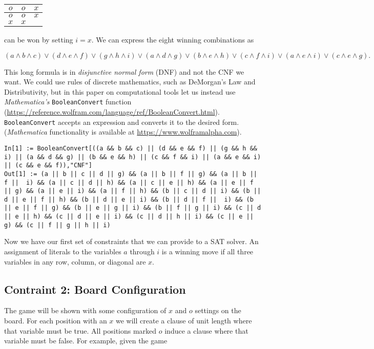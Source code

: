 \documentclass[12pt]{article}
\newcommand{\tictactoe}[9]{\begin{center}\begin{tabular}{ c | c | c }{$#1$} & {$#2$} & {$#3$} \\ \hline {$#4$} & {$#5$} & {$#6$} \\ \hline {$#7$} & {$#8$} & {$#9$} \end{tabular}\end{center}}
\begin{document}
\tictactoe{o}{o}{x}{o}{o}{x}{x}{x}{}

can be won by setting $i=x$.  We can express the eight winning combinations as

\begin{equation}(a \wedge b \wedge c) \vee (d \wedge e \wedge f) \vee (g \wedge h \wedge i)
\vee
(a \wedge d \wedge g) \vee (b \wedge e \wedge h) \vee (c \wedge f \wedge i)
\vee
(a \wedge e \wedge i) \vee (c \wedge e \wedge g).\end{equation}

This long formula is in \textit{disjunctive normal form} (DNF) and not the CNF we want.
We could use rules of discrete mathematics, such as DeMorgan's Law and Distributivity, but in this paper on computational tools let us instead use \textit{Mathematica's} \texttt{BooleanConvert} function (\url{https://reference.wolfram.com/language/ref/BooleanConvert.html}).
\texttt{BooleanConvert} accepts an expression and converts it to the desired form.
(\textit{Mathematica} functionality is available at \url{https://www.wolframalpha.com}).

\begin{lstlisting}
In[1] := BooleanConvert[((a && b && c) || (d && e && f) || (g && h && i) || (a && d && g) || (b && e && h) || (c && f && i) || (a && e && i) || (c && e && f)),"CNF"]
Out[1] := (a || b || c || d || g) && (a || b || f || g) && (a || b || f ||  i) && (a || c || d || h) && (a || c || e || h) && (a || e || f || g) && (a || e || i) && (a || f || h) && (b || c || d || i) && (b || d || e || f || h) && (b || d || e || i) && (b || d || f ||  i) && (b || e || f || g) && (b || e || g || i) && (b || f || g || i) && (c || d || e || h) && (c || d || e || i) && (c || d || h || i) && (c || e || g) && (c || f || g || h || i)
\end{lstlisting}

Now we have our first set of constraints that we can provide to a SAT solver.
An assignment of literals to the variables $a$ through $i$ is a winning move if all three variables in any row, column, or diagonal are $x$.

\subsection{Contraint 2: Board Configuration}

The game will be shown with some configuration of $x$ and $o$ settings on the board.
For each position with an $x$ we will create a clause of unit length where that variable must be true.
All positions marked $o$ induce a clause where that variable must be false.
For example, given the game
\end{document}
